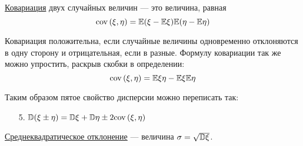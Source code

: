 \begin{Def}
\underline{Ковариация} двух случайных величин --- это величина, равная
$$ {\rm cov \,}(\xi,\eta) = \mathbb{E}(\xi - \mathbb{E}\xi)\mathbb{E}(\eta - \mathbb{E}\eta)$$
\end{Def}

Ковариация положительна, если случайные величины одновременно отклоняются в одну сторону и отрицательная, если в разные. Формулу ковариации так же можно упростить, раскрыв скобки в определении:
$${\rm cov \,}(\xi,\eta) = \mathbb{E}\xi\eta - \mathbb{E}\xi\mathbb{E}\eta$$

Таким образом пятое свойство дисперсии можно переписать так:
\begin{itemize}
	\item[5.] $\mathbb{D}(\xi \pm \eta) = \mathbb{D}\xi + \mathbb{D}\eta \pm 2{\rm cov \,}(\xi,\eta)$
\end{itemize}

\begin{Def}
\underline{Среднеквадратическое отклонение} --- величина $\sigma = \sqrt{\mathbb{D}\xi}$.
\end{Def}



\newpage

